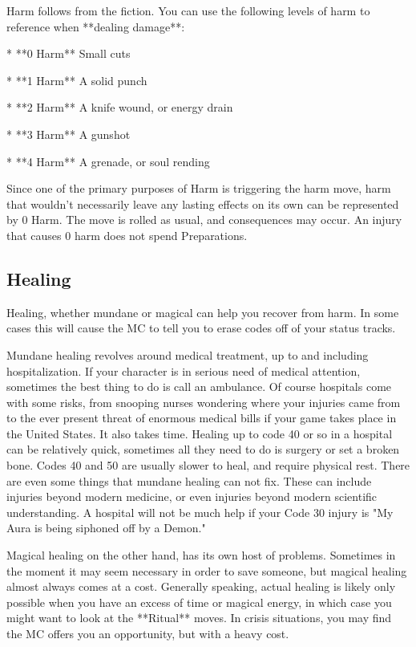 \documentclass[
  oneside,
  statementpaper,
  9pt]{memoir}
\begin{document}
\begin{MC}

Harm follows from the fiction. You can use the following levels of harm to reference when **dealing damage**:

* **0 Harm** Small cuts

* **1 Harm** A solid punch

* **2 Harm** A knife wound, or energy drain

* **3 Harm** A gunshot

* **4 Harm** A grenade, or soul rending

Since one of the primary purposes of Harm is triggering the harm move, harm that wouldn’t necessarily leave any lasting effects on its own can be represented by 0 Harm. The move is rolled as usual, and consequences may occur. An injury that causes 0 harm does not spend Preparations.

\end{MC}

\hypertarget{healing}{%
\subsection{Healing}\label{healing}}

\begin{Player}

Healing, whether mundane or magical can help you recover from harm. In some cases this will cause the MC to tell you to erase codes off of your status tracks. 

Mundane healing revolves around medical treatment, up to and including hospitalization. If your character is in serious need of medical attention, sometimes the best thing to do is call an ambulance. Of course hospitals come with some risks, from snooping nurses wondering where your injuries came from to the ever present threat of enormous medical bills if your game takes place in the United States. It also takes time. Healing up to code 40 or so in a hospital can be relatively quick, sometimes all they need to do is surgery or set a broken bone. Codes 40 and 50 are usually slower to heal, and require physical rest. There are even some things that mundane healing can not fix. These can include injuries beyond modern medicine, or even injuries beyond modern scientific understanding. A hospital will not be much help if your Code 30 injury is "My Aura is being siphoned off by a Demon."

Magical healing on the other hand, has its own host of problems. Sometimes in the moment it may seem necessary in order to save someone, but magical healing almost always comes at a cost. Generally speaking, actual healing is likely only possible when you have an excess of time or magical energy, in which case you might want to look at the **Ritual** moves. In crisis situations, you may find the MC offers you an opportunity, but with a heavy cost.

\end{Player}
\end{document}

